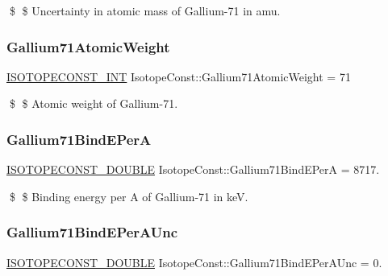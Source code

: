 \$ \$ Uncertainty in atomic mass of Gallium-\/71 in amu. \mbox{\label{group___isotope_const-_gallium-_ga71_gae1f1b8e0dd499deb0f361b2b0ab3ac49}} 
\subsubsection{\texorpdfstring{Gallium71\+Atomic\+Weight}{Gallium71AtomicWeight}}
{\footnotesize\ttfamily \mbox{\hyperlink{group___isotope_const-_macros_ga5f18360b3e99483a35c32d789e62621c}{I\+S\+O\+T\+O\+P\+E\+C\+O\+N\+S\+T\+\_\+\+I\+NT}} Isotope\+Const\+::\+Gallium71\+Atomic\+Weight = 71}

\$ \$ Atomic weight of Gallium-\/71. \mbox{\label{group___isotope_const-_gallium-_ga71_ga77bf328b767cf5350077dbc35513fb6f}} 
\subsubsection{\texorpdfstring{Gallium71\+Bind\+E\+PerA}{Gallium71BindEPerA}}
{\footnotesize\ttfamily \mbox{\hyperlink{group___isotope_const-_macros_ga8f45a7272ce02c0b4c65c44636ed719a}{I\+S\+O\+T\+O\+P\+E\+C\+O\+N\+S\+T\+\_\+\+D\+O\+U\+B\+LE}} Isotope\+Const\+::\+Gallium71\+Bind\+E\+PerA = 8717.}

\$ \$ Binding energy per A of Gallium-\/71 in keV. \mbox{\label{group___isotope_const-_gallium-_ga71_ga02c7d66f658467bffa46e72f6849b2fd}} 
\subsubsection{\texorpdfstring{Gallium71\+Bind\+E\+Per\+A\+Unc}{Gallium71BindEPerAUnc}}
{\footnotesize\ttfamily \mbox{\hyperlink{group___isotope_const-_macros_ga8f45a7272ce02c0b4c65c44636ed719a}{I\+S\+O\+T\+O\+P\+E\+C\+O\+N\+S\+T\+\_\+\+D\+O\+U\+B\+LE}} Isotope\+Const\+::\+Gallium71\+Bind\+E\+Per\+A\+Unc = 0.}

